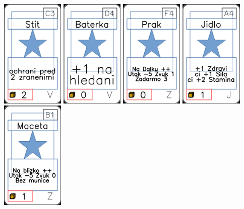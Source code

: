 \documentclass[a4paper]{article}
\begin{document}
	\includegraphics[width=3.0cm]{img-1_72}
	\includegraphics[width=3.0cm]{img-1_78}
	\includegraphics[width=3.0cm]{img-1_88}
	\includegraphics[width=3.0cm]{img-1_3}
	\includegraphics[width=3.0cm]{img-1_95}
\end{document}
